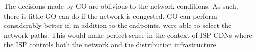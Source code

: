  The decisions made by GO are
oblivious to the network conditions. As such, there is little GO can
do if the network is congested. GO can perform considerably better if,
in addition to the endpoints, were able to select the network
paths. This would make perfect sense in the context of ISP CDNs where
the ISP controls both the network and the distribution infrastructure.






